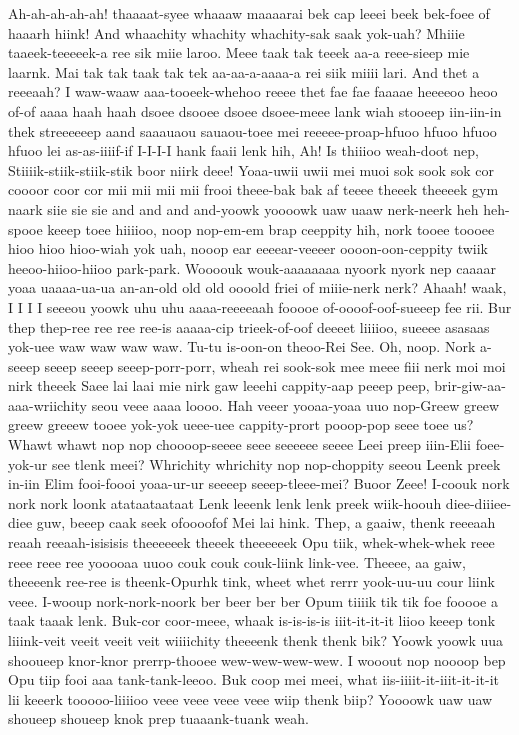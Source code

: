 \documentclass[12pt,a4paper]{article}
\begin{document}
\begin{drama}
\epopspeaks
Ah-ah-ah-ah-ah! thaaaat-syee whaaaw maaaarai bek cap leeei beek bek-foee of haaarh hiink! And whaachity whachity whachity-sak saak yok-uah?
\pistspeaks
Mhiiie taaeek-teeeeek-a ree sik miie laroo. Meee taak tak teeek aa-a reee-sieep mie laarnk. Mai tak tak taak tak tek aa-aa-a-aaaa-a rei siik miiii lari.
\epopspeaks
And thet a reeeaah?
\pistspeaks
I waw-waaw aaa-tooeek-whehoo reeee thet fae fae faaaae heeeeoo heoo of-of aaaa haah haah dsoee dsooee dsoee dsoee-meee lank wiah stooeep iin-iin-in thek streeeeeep aand saaauaou sauaou-toee mei reeeee-proap-hfuoo hfuoo hfuoo hfuoo lei as-as-iiiif-if I-I-I-I hank faaii lenk hih, Ah! Is thiiioo weah-doot nep, Stiiiik-stiik-stiik-stik boor niirk deee! Yoaa-uwii uwii mei muoi sok sook sok cor coooor coor cor mii mii mii mii frooi theee-bak bak af teeee theeek theeeek gym naark siie sie sie and and and and-yoowk yoooowk uaw uaaw nerk-neerk heh heh-spooe keeep toee hiiiioo, noop nop-em-em brap ceeppity hih, nork tooee toooee hioo hioo hioo-wiah yok uah, nooop ear eeeear-veeeer oooon-oon-ceppity twiik heeoo-hiioo-hiioo park-park. Woooouk wouk-aaaaaaaa nyoork nyork nep caaaar yoaa uaaaa-ua-ua an-an-old old old oooold friei of miiie-nerk nerk?
\epopspeaks
Ahaah! waak, I I I I seeeou yoowk uhu uhu aaaa-reeeeaah fooooe of-oooof-oof-sueeep fee rii. Bur thep thep-ree ree ree ree-is aaaaa-cip trieek-of-oof deeeet liiiioo, sueeee asasaas yok-uee waw waw waw waw. Tu-tu is-oon-on theoo-Rei See.
\euelspeaks
Oh, noop. Nork a-seeep seeep seeep seeep-porr-porr, wheah rei sook-sok mee meee fiii nerk moi moi nirk theeek Saee lai laai mie nirk gaw leeehi cappity-aap peeep peep, brir-giw-aa-aaa-wriichity seou veee aaaa loooo. Hah veeer yooaa-yoaa uuo nop-Greew greew greew greeew tooee yok-yok ueee-uee cappity-prort pooop-pop seee toee us?
\epopspeaks
Whawt whawt nop nop choooop-seeee seee seeeeee seeee Leei preep iiin-Elii foee-yok-ur see tlenk meei? Whrichity whrichity nop nop-choppity seeou Leenk preek in-iin Elim fooi-foooi yoaa-ur-ur seeeep seeep-tleee-mei?
\euelspeaks
Buoor Zeee! I-coouk nork nork nork loonk atataataataat Lenk leeenk lenk lenk preek wiik-hoouh diee-diiiee-diee guw, beeep caak seek ofoooofof Mei lai hink.
\epopspeaks
Thep, a gaaiw, thenk reeeaah reaah reeaah-isisisis theeeeeek theeek theeeeeek Opu tiik, whek-whek-whek reee reee reee ree yooooaa uuoo couk couk couk-liink link-vee. Theeee, aa gaiw, theeeenk ree-ree is theenk-Opurhk tink, wheet whet rerrr yook-uu-uu cour liink veee.
\euelspeaks
I-wooup nork-nork-noork ber beer ber ber Opum tiiiik tik tik foe fooooe a taak taaak lenk. Buk-cor coor-meee, whaak is-is-is-is iiit-it-it-it liioo keeep tonk liiink-veit veeit veeit veit wiiiichity theeeenk thenk thenk bik? Yoowk yoowk uua shooueep knor-knor prerrp-thooee wew-wew-wew-wew. I wooout nop noooop bep Opu tiip fooi aaa tank-tank-leeoo. Buk coop mei meei, what iis-iiiit-it-iiit-it-it-it lii keeerk tooooo-liiiioo veee veee veee veee wiip thenk biip? Yoooowk uaw uaw shoueep shoueep knok prep tuaaank-tuank weah.

\end{drama}
\end{document}

